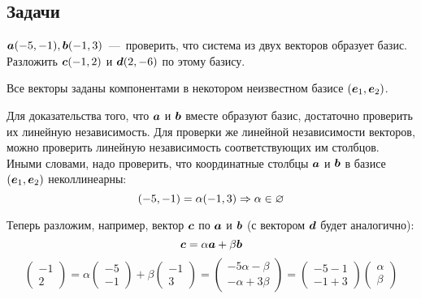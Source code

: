 \documentclass[a4paper,12pt]{article}
\begin{document}
  
  \subsection{Задачи}
  
  \begin{problem}[1.6]
    $\boldsymbol a(-5, -1), \boldsymbol b(-1, 3)$~---~проверить, что система из двух векторов образует базис.
    Разложить $\boldsymbol c(-1, 2)$ и $\boldsymbol d(2, -6)$ по этому базису.
  \end{problem}
  
  \begin{solution}
    Все векторы заданы компонентами в некотором неизвестном базисе $(\boldsymbol e_1, \boldsymbol e_2)$.
    
    Для доказательства того, что $\boldsymbol a$ и $\boldsymbol b$ вместе образуют базис, достаточно проверить их линейную независимость.
    Для проверки же линейной независимости векторов, можно проверить линейную независимость соответствующих им столбцов.
    Иными словами, надо проверить, что координатные столбцы $\boldsymbol a$ и $\boldsymbol b$ в базисе $(\boldsymbol e_1, \boldsymbol e_2)$ неколлинеарны:
    \[
      (-5, -1) = \alpha (-1, 3) \Rightarrow \alpha \in \varnothing
    \]
    
    Теперь разложим, например, вектор $\boldsymbol c$ по $\boldsymbol a$ и $\boldsymbol b$ (с вектором $\boldsymbol d$ будет аналогично):
    \[
      \boldsymbol c = \alpha \boldsymbol a + \beta \boldsymbol b
    \]
    \[
      \begin{pmatrix}
        -1 \\ 2
      \end{pmatrix}
      = \alpha \begin{pmatrix}
          -5 \\ -1
        \end{pmatrix}
        + \beta \begin{pmatrix}
          -1 \\ 3
        \end{pmatrix}
      = \begin{pmatrix}
          -5\alpha - \beta\\
          -\alpha + 3\beta
        \end{pmatrix}
      = \begin{pmatrix}
          -5 -1\\
          -1 + 3
        \end{pmatrix}
        \begin{pmatrix}
          \alpha \\ \beta
        \end{pmatrix}
    \]
    

\end{solution}
\end{document}
